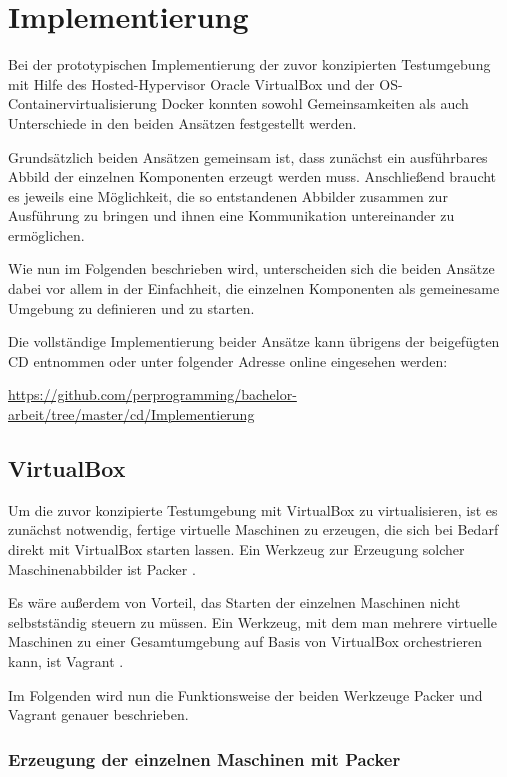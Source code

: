 \section{Implementierung}

Bei der prototypischen Implementierung der zuvor konzipierten Testumgebung mit Hilfe des Hosted-Hypervisor Oracle VirtualBox und der OS-Containervirtualisierung Docker konnten sowohl Gemeinsamkeiten als auch Unterschiede in den beiden Ansätzen festgestellt werden.

Grundsätzlich beiden Ansätzen gemeinsam ist, dass zunächst ein ausführbares Abbild der einzelnen Komponenten erzeugt werden muss. Anschließend braucht es jeweils eine Möglichkeit, die so entstandenen Abbilder zusammen zur Ausführung zu bringen und ihnen eine Kommunikation untereinander zu ermöglichen.

Wie nun im Folgenden beschrieben wird, unterscheiden sich die beiden Ansätze dabei vor allem in der Einfachheit, die einzelnen Komponenten als gemeinesame Umgebung zu definieren und zu starten.

Die vollständige Implementierung beider Ansätze kann übrigens der beigefügten CD entnommen oder unter folgender Adresse online eingesehen werden:

\href{https://github.com/perprogramming/bachelor-arbeit/tree/master/cd/Implementierung}{https://github.com/perprogramming/bachelor-arbeit/tree/master/cd/Implementierung}

\subsection{VirtualBox}

Um die zuvor konzipierte Testumgebung mit VirtualBox zu virtualisieren, ist es zunächst notwendig, fertige virtuelle Maschinen zu erzeugen, die sich bei Bedarf direkt mit VirtualBox starten lassen. Ein Werkzeug zur Erzeugung solcher Maschinenabbilder ist Packer \citep[Vgl.][]{Packer15}.

Es wäre außerdem von Vorteil, das Starten der einzelnen Maschinen nicht selbstständig steuern zu müssen. Ein Werkzeug, mit dem man mehrere virtuelle Maschinen zu einer Gesamtumgebung auf Basis von VirtualBox orchestrieren kann, ist Vagrant \citep[Vgl.][]{Vagrant:001}.

Im Folgenden wird nun die Funktionsweise der beiden Werkzeuge Packer und Vagrant genauer beschrieben.

\subsubsection{Erzeugung der einzelnen Maschinen mit Packer}

